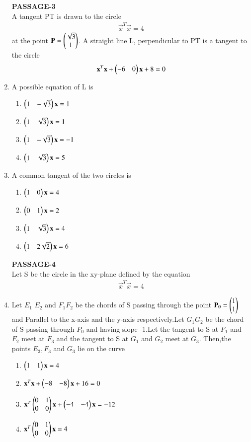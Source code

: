 \begin{enumerate}[label=\arabic*.,ref=\thesubsection.\theenumi]
\textbf{PASSAGE-3}\\    
A tangent PT is drawn to the circle 
\begin{align}
\vec{x}^T\vec{x}=4
\end{align} 
at the point $\mathbf{P}=\begin{pmatrix}\sqrt{3}\\1\end{pmatrix}$. A straight line L, perpendicular to PT is a tangent to the circle \begin{align}
\mathbf{x}^T\mathbf{x}+\begin{pmatrix}-6&0\end{pmatrix}\mathbf{x}+8=0
\end{align}    
    
\item A possible equation of L is
\begin{enumerate}
\item $\begin{pmatrix}1&-\sqrt{3}\end{pmatrix}\mathbf{x} =1$
\item $\begin{pmatrix}1&\sqrt{3}\end{pmatrix}\mathbf{x}=1$
\item $\begin{pmatrix}1&-\sqrt{3}\end{pmatrix}\mathbf{x}=-1$
\item $\begin{pmatrix}1&\sqrt{3}\end{pmatrix}\mathbf{x}=5$
\end{enumerate}

\item A common tangent of the two circles is
\begin{enumerate}
\item $\begin{pmatrix}1&0\end{pmatrix}\mathbf{x}=4$
\item $\begin{pmatrix}0&1\end{pmatrix}\mathbf{x}=2$
\item $\begin{pmatrix}1&\sqrt{3}\end{pmatrix}\mathbf{x} =4$
\item $\begin{pmatrix}1&2\sqrt{2}\end{pmatrix}\mathbf{x} =6$    
\end{enumerate}    
 
\textbf{PASSAGE-4}\\  
Let S be the circle in the xy-plane defined by the equation  
\begin{align}
\vec{x}^T\vec{x}=4
\end{align}
\item Let $E_1$ $E_2$ and $F_1 F_2$ be the chords of S passing through the point $\mathbf{P_0}=\begin{pmatrix}1\\1\end{pmatrix}$ and Parallel to the x-axis and the y-axis respectively.Let $G_1G_2$ be the chord of S passing through $P_0$ and having slope -1.Let the tangent to S at $F_1$ and $F_2$ meet at $F_3$ and the tangent to S at $G_1$ and $G_2$ meet at $G_3.$ Then,the points $E_3,F_3$ and $G_3$ lie on the curve
\begin{enumerate}
\item $\begin{pmatrix}1&1\end{pmatrix}\mathbf{x}=4$
\item $\mathbf{x}^T\mathbf{x}+\begin{pmatrix}-8&-8\end{pmatrix}\mathbf{x}+16=0$
\item $\mathbf{x}^T\begin{pmatrix} 0 & 1 \\ 0 & 0\end{pmatrix}\mathbf{x}+\begin{pmatrix}-4&-4\end{pmatrix} \mathbf{x} = -12$
\item $\mathbf{x}^T \begin{pmatrix} 0 & 1 \\ 0 & 0\end{pmatrix}\mathbf{x}=4$  
\end{enumerate}
  

\end{enumerate}

